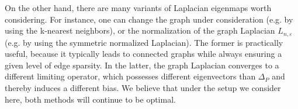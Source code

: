 \documentclass{article}
\newcommand{\1}{\mathbf{1}}
\theoremstyle{alden}
\theoremstyle{aldenthm}
\theoremstyle{definition}
\theoremstyle{remark}
\begin{document}
On the other hand, there are many variants of Laplacian eigenmaps worth considering. For instance, one can change the graph under consideration (e.g. by using the k-nearest neighbors), or the normalization of the graph Laplacian $L_{n,\varepsilon}$ (e.g. by using the symmetric normalized Laplacian). The former is practically useful, because it typically leads to connected graphs while always ensuring a given level of edge sparsity. In the latter, the graph Laplacian converges to a different limiting operator, which possesses different eigenvectors than $\Delta_P$ and thereby induces a different bias. We believe that under the setup we consider here, both methods will continue to be optimal.



 

\appendix


\end{document}
